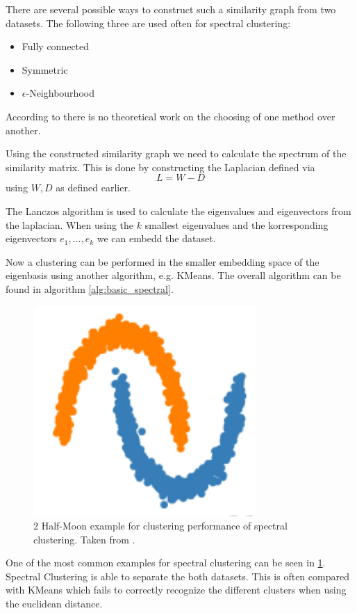 There are several possible ways to construct such a similarity graph from two datasets.
The following three are used often for spectral clustering:
\begin{itemize}
  \item Fully connected
  \item Symmetric
  \item \(\epsilon\)-Neighbourhood
\end{itemize}
According to \cite{von_luxburg_tutorial_2007} there is no theoretical work on the choosing of one method over
another.

Using the constructed similarity graph we need to calculate the spectrum of the similarity matrix.
This is done by constructing the Laplacian defined via
\[L = W - D\]
using \(W, D\) as defined earlier.

The Lanczos algorithm \cite{lanczos_iteration_1950} is used to calculate the eigenvalues and eigenvectors from the laplacian.
When using the \(k\) smallest eigenvalues and the korresponding eigenvectors \(e_1, \ldots, e_k\) we can embedd the dataset.

Now a clustering can be performed in the smaller embedding space of the eigenbasis using another algorithm, e.g. KMeans.
The overall algorithm can be found in algorithm \ref{alg:basic_spectral}.

\begin{figure}
  \includegraphics{images/spectral_example.png}
  \caption{2 Half-Moon example for clustering performance of spectral clustering. Taken from \cite{noauthor_23_2020}.}
  \label{fig:spectral_example}
\end{figure}

One of the most common examples for spectral clustering can be seen in \cref{fig:spectral_example}. Spectral Clustering is able to
separate the both datasets. This is often compared with KMeans which fails to correctly recognize the different clusters when using the euclidean distance.

